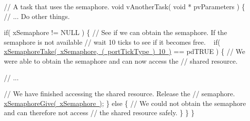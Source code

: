 \begin{DoxyPre}// A task that uses the semaphore.
void vAnotherTask( void * pvParameters )
\{
   // ... Do other things.\end{DoxyPre}



\begin{DoxyPre}   if( xSemaphore != NULL )
   \{
       // See if we can obtain the semaphore.  If the semaphore is not available
       // wait 10 ticks to see if it becomes free.  
~\newline
       if( \mbox{\hyperlink{semphr_8h_af116e436d2a5ae5bd72dbade2b5ea930}{xSemaphoreTake( xSemaphore, ( portTickType ) 10 )}} == pdTRUE )
       \{
           // We were able to obtain the semaphore and can now access the
           // shared resource.\end{DoxyPre}



\begin{DoxyPre}           // ...\end{DoxyPre}



\begin{DoxyPre}           // We have finished accessing the shared resource.  Release the 
           // semaphore.
           \mbox{\hyperlink{semphr_8h_aae55761cabfa9bf85c8f4430f78c0953}{xSemaphoreGive( xSemaphore )}};
       \}
       else
       \{
           // We could not obtain the semaphore and can therefore not access
           // the shared resource safely.
       \}
   \}
\}
\end{DoxyPre}
 